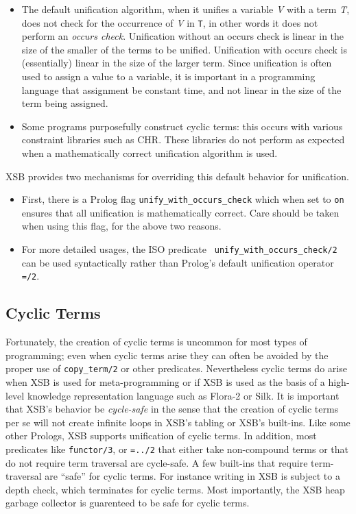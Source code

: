 \begin{itemize}
%
\item The default unification algorithm, when it unifies a variable
  {\em V} with a term {\em T}, does not check for the occurrence of
  {\em V} in {\tt T}, in other words it does not perform an {\em
  occurs check}.  Unification without an occurs check is linear in the
  size of the smaller of the terms to be unified.  Unification with
  occurs check is (essentially) linear in the size of the larger term.
  Since unification is often used to assign a value to a variable, it
  is important in a programming language that assignment be constant
  time, and not linear in the size of the term being assigned.
%
\item Some programs purposefully construct cyclic terms: this occurs
  with various constraint libraries such as CHR.  These libraries do
  not perform as expected when a mathematically correct unification
  algorithm is used.
\end{itemize}

XSB provides two mechanisms for overriding this default behavior for
unification.

\begin{itemize}
\item First, there is a Prolog flag {\tt unify\_with\_occurs\_check}
  which when set to {\tt on} ensures that all unification is
  mathematically correct.  Care should be taken when using this flag,
  for the above two reasons.
%
\item For more detailed usages, the ISO predicate {\tt
  unify\_with\_occurs\_check/2} can be used syntactically rather than
  Prolog's default unification operator {\tt =/2}.
\end{itemize}

\subsection{Cyclic Terms}
%
    Fortunately, the creation of cyclic terms is uncommon for most
    types of programming; even when cyclic terms arise they can often
    be avoided by the proper use of {\tt copy\_term/2} or other
    predicates.  Nevertheless cyclic terms do arise when XSB is used
    for meta-programming or if XSB is used as the basis of a
    high-level knowledge representation language such as Flora-2 or
    Silk.  It is important that XSB's behavior be {\em cycle-safe} in
    the sense that the creation of cyclic terms per se will not create
    infinite loops in XSB's tabling or XSB's built-ins.  Like some
    other Prologs, XSB supports unification of cyclic terms.  In
    addition, most predicates like {\tt functor/3}, or {\tt =../2}
    that either take non-compound terms or that do not require term
    traversal are cycle-safe.  A few built-ins that require
    term-traversal are ``safe'' for cyclic terms.  For instance
    writing in XSB is subject to a depth check, which terminates for
    cyclic terms.  Most importantly, the XSB heap garbage collector is
    guarenteed to be safe for cyclic terms.

